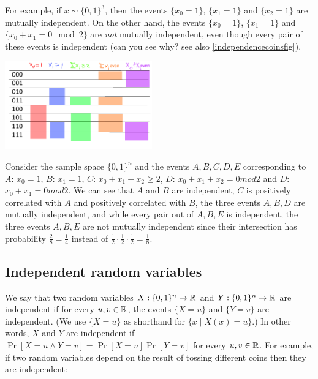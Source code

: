 For example, if \(x\sim \{0,1\}^3\), then the events \(\{ x_0=1 \}\),
\(\{ x_1 = 1\}\) and \(\{x_2 = 1 \}\) are mutually independent. On the
other hand, the events \(\{x_0 = 1 \}\), \(\{x_1 = 1\}\) and
\(\{ x_0 + x_1 = 0 \mod 2 \}\) are \emph{not} mutually independent, even
though every pair of these events is independent (can you see why? see
also \cref{independencecoinsfig}).

\begin{marginfigure}
\centering
\includegraphics[width=\linewidth, height=1.5in, keepaspectratio]{../figure/independencecoins.png}
\caption{Consider the sample space \(\{0,1\}^n\) and the events
\(A,B,C,D,E\) corresponding to \(A\): \(x_0=1\), \(B\): \(x_1=1\),
\(C\): \(x_0+x_1+x_2 \geq 2\), \(D\): \(x_0+x_1+x_2 = 0 mod 2\) and
\(D\): \(x_0+x_1 = 0 mod 2\). We can see that \(A\) and \(B\) are
independent, \(C\) is positively correlated with \(A\) and positively
correlated with \(B\), the three events \(A,B,D\) are mutually
independent, and while every pair out of \(A,B,E\) is independent, the
three events \(A,B,E\) are not mutually independent since their
intersection has probability \(\tfrac{2}{8}=\tfrac{1}{4}\) instead of
\(\tfrac{1}{2}\cdot \tfrac{1}{2} \cdot \tfrac{1}{2} = \tfrac{1}{8}\).}
\label{independencecoinsfig}
\end{marginfigure}

\subsection{Independent random
variables}\label{0-Independent-random-var}

We say that two random variables \(X:\{0,1\}^n \rightarrow {\mathbb{R}}\) and
\(Y:\{0,1\}^n \rightarrow {\mathbb{R}}\) are independent if for every
\(u,v \in {\mathbb{R}}\), the events \(\{ X=u \}\) and \(\{ Y=v \}\) are
independent. (We use \(\{ X=u \}\) as shorthand for
\(\{ x \;|\; X(x)=u \}\).) In other words, \(X\) and \(Y\) are
independent if \(\Pr[ X=u \wedge Y=v]=\Pr[X=u]\Pr[Y=v]\) for every
\(u,v \in {\mathbb{R}}\). For example, if two random variables depend on the
result of tossing different coins then they are independent:

